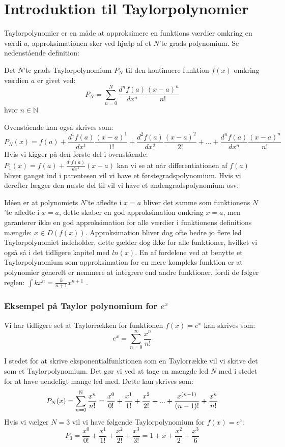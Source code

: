 \chapter{Introduktion til Taylorpolynomier}
\label{ch:tp}
Taylorpolynomier er en måde at approksimere en funktions værdier omkring en værdi $a$, 
approksimationen sker ved hjælp af et $N$'te grads polynomium. Se nedenstående definition: 
\begin{defn}
    Det $N$'te grads Taylorpolynomium $P_N$ til den kontinuere funktion $f(x)$ omkring værdien $a$ er givet ved:
    \[
    P_N = \sum^{N}_{n=0} \frac{d^n f(a)}{dx^n}\frac{(x-a)^{n}}{n!}
    \]
    hvor $n \in \mathbb{N}$
\end{defn}
\label{def:taylorPolynomium}
Ovenstående kan også skrives som:
    \[
    P_N(x)=f(a)+\frac{d^1 f(a)}{dx^1} \frac{(x-a)^{1}}{1!}+\frac{d^2 f(a)}{dx^2} \frac{(x-a)^{2}}{2!}+...+\frac{d^n f(a)}{dx^n} \frac{(x-a)^{n}}{n!}
    \]
Hvis vi kigger på den første del i ovenstående: $P_1(x)=f(a)+\frac{d^1 f(a)}{dx^1}(x-a)$ kan vi se at når differentiationen af $f(a)$ bliver ganget ind i parentesen vil vi have et førstegradspolynomium. 
Hvis vi derefter lægger den næste del til vil vi have et andengradspolynomium osv. 

Idéen er at polynomiets $N$'te afledte i $x = a$ bliver det samme som funktionens $N$'te afledte i $x = a$, 
dette skaber en god approksimation omkring $x = a$, men garanterer ikke en god approksimation 
for alle værdier i funktionens definitions mængde: $x \in D(f(x))$. Approksimation bliver dog ofte bedre jo 
flere led Taylorpolynomiet indeholder, dette gælder dog ikke for alle funktioner, hvilket vi også så i det tidligere kapitel med $ln(x)$.
En af fordelene ved at benytte et Taylorpolynomium som approksimation for en mere kompleks funktion
er at polynomier generelt er nemmere at integrere end andre funktioner, fordi de følger reglen: $\int k x^n = \frac{k}{n + 1}x^{n + 1}$ .


\subsection*{Eksempel på Taylor polynomium for $e^x$}
Vi har tidligere set at Taylorrækken for funktionen $f(x)=e^x$ kan skrives som:
\[
e^x=\sum^{\infty}_{n=0}\frac{x^n}{n!}
\]

I stedet for at skrive eksponentialfunktionen som en Taylorrække vil vi skrive det som et Taylorpolynomium. Det gør vi ved at tage en mængde led $N$ med  i stedet for at have uendeligt mange led med. Dette kan skrives som:
\[
P_N(x)=\sum^{\mathbb{N}}_{n=0}\frac{x^n}{n!}=\frac{x^0}{0!}+\frac{x^1}{1!}+\frac{x^2}{2!}+...+\frac{x^{(n-1)}}{(n-1)!}+\frac{x^n}{n!}
\]
Hvis vi vælger $N=3$ vil vi have følgende Taylorpolynomium for $f(x)=e^x$:
\[
P_3=\frac{x^0}{0!}+\frac{x^1}{1!}+\frac{x^2}{2!}+\frac{x^3}{3!}=1+x+\frac{x^2}{2}+\frac{x^3}{6}
\]

